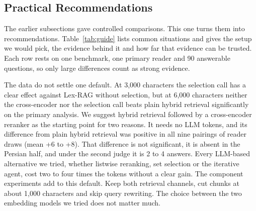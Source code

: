 \subsection{Practical Recommendations}
\label{sec:practice}

The earlier subsections gave controlled comparisons. This one turns them into recommendations. Table~\ref{tab:guide} lists common situations and gives the setup we would pick, the evidence behind it and how far that evidence can be trusted. Each row rests on one benchmark, one primary reader and 90 answerable questions, so only large differences count as strong evidence.


The data do not settle one default. At 3,000 characters the selection call has a clear effect against Lex-RAG without selection, but at 6,000 characters neither the cross-encoder nor the selection call beats plain hybrid retrieval significantly on the primary analysis. We suggest hybrid retrieval followed by a cross-encoder reranker as the starting point for two reasons. It needs no LLM tokens, and its difference from plain hybrid retrieval was positive in all nine pairings of reader draws (mean +6 to +8). That difference is not significant, it is absent in the Persian half, and under the second judge it is 2 to 4 answers. Every LLM-based alternative we tried, whether listwise reranking, set selection or the iterative agent, cost two to four times the tokens without a clear gain. The component experiments add to this default. Keep both retrieval channels, cut chunks at about 1,000 characters and skip query rewriting. The choice between the two embedding models we tried does not matter much.

